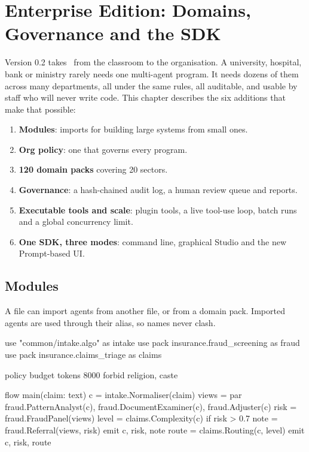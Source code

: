 \chapter{Enterprise Edition: Domains, Governance and the SDK}
\label{ch:enterprise}

Version 0.2 takes \algolang\ from the classroom to the organisation. A university, hospital, bank or ministry rarely needs one multi-agent program. It needs dozens of them across many departments, all under the same rules, all auditable, and usable by staff who will never write code. This chapter describes the six additions that make that possible:

\begin{enumerate}
\item \textbf{Modules}:  imports for building large systems from small ones.
\item \textbf{Org policy}: one  that governs every program.
\item \textbf{120 domain packs} covering 20 sectors.
\item \textbf{Governance}: a hash-chained audit log, a human review queue and reports.
\item \textbf{Executable tools and scale}: plugin tools, a live tool-use loop, batch runs and a global concurrency limit.
\item \textbf{One SDK, three modes}: command line, graphical Studio and the new Prompt-based UI.
\end{enumerate}

\section{Modules}

A file can import agents from another file, or from a domain pack. Imported agents are used through their alias, so names never clash.

\begin{algo}[title=examples/enterprise/claims\_pipeline.algo]
use "common/intake.algo" as intake
use pack insurance.fraud_screening as fraud
use pack insurance.claims_triage as claims

policy {
    budget tokens 8000
    forbid religion, caste
}

flow main(claim: text) {
    c     = intake.Normaliser(claim)
    views = par { fraud.PatternAnalyst(c), fraud.DocumentExaminer(c), fraud.Adjuster(c) }
    risk  = fraud.FraudPanel(views)
    level = claims.Complexity(c)
    if risk > 0.7 {
        note = fraud.Referral(views, risk)
        emit c, risk, note
    }
    route = claims.Routing(c, level)
    emit c, risk, route
}
\end{algo}

